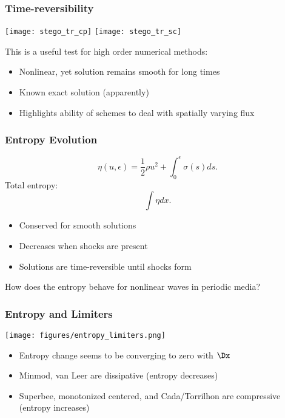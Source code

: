\documentclass[xcolor=pst,dvipsnames]{beamer}
\begin{document}
\begin{frame} \frametitle{Time-reversibility}
\begin{center}      \texttt{[image: stego\_tr\_cp]}
      \texttt{[image: stego\_tr\_sc]} \end{center}
This is a useful test for high order numerical methods:
    \begin{itemize}
        \item Nonlinear, yet solution remains smooth for long times
        \item Known exact solution (apparently)
        \item Highlights ability of schemes to deal with spatially
                varying flux
    \end{itemize}
\end{frame}


\begin{frame} \frametitle{Entropy Evolution}
$$\eta(u,\epsilon) = \frac{1}{2}\rho u^2 + \int_0^\epsilon \sigma(s) ds.$$
Total entropy: $$\int \eta dx.$$
\begin{itemize}
  \item Conserved for smooth solutions
  \item Decreases when shocks are present
  \item Solutions are time-reversible until shocks form
\end{itemize}
How does the entropy behave for nonlinear waves in periodic media?
\begin{center}  \end{center}
\end{frame}

\begin{frame} \frametitle{Entropy and Limiters}
  \begin{center} \texttt{[image: figures/entropy\_limiters.png]} \end{center}
  \begin{itemize}
    \item Entropy change seems to be converging to zero with $\Dx$
    \item Minmod, van Leer are dissipative (entropy decreases)
    \item Superbee, monotonized centered, and Cada/Torrilhon are 
            compressive (entropy increases)
  \end{itemize}
\end{frame}
\end{document}
